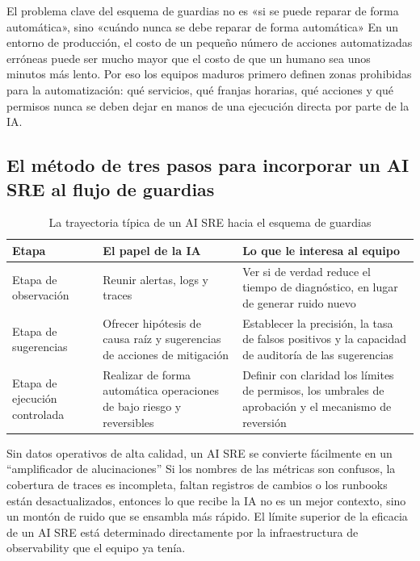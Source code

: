 \documentclass[a4paper]{article}
\begin{document}
\begin{importantbox}{El problema clave del esquema de guardias no es «si se puede reparar de forma automática», sino «cuándo nunca se debe reparar de forma automática»}
En un entorno de producción, el costo de un pequeño número de acciones automatizadas erróneas puede ser mucho mayor que el costo de que un humano sea unos minutos más lento. Por eso los equipos maduros primero definen zonas prohibidas para la automatización: qué servicios, qué franjas horarias, qué acciones y qué permisos nunca se deben dejar en manos de una ejecución directa por parte de la IA.
\end{importantbox}

\subsection{El método de tres pasos para incorporar un AI SRE al flujo de guardias}

\begin{table}[H]
\centering
\begin{tabular}{p{} p{} p{}}
\toprule
Etapa & El papel de la IA & Lo que le interesa al equipo \\
\midrule
Etapa de observación & Reunir alertas, logs y traces & Ver si de verdad reduce el tiempo de diagnóstico, en lugar de generar ruido nuevo \\
Etapa de sugerencias & Ofrecer hipótesis de causa raíz y sugerencias de acciones de mitigación & Establecer la precisión, la tasa de falsos positivos y la capacidad de auditoría de las sugerencias \\
Etapa de ejecución controlada & Realizar de forma automática operaciones de bajo riesgo y reversibles & Definir con claridad los límites de permisos, los umbrales de aprobación y el mecanismo de reversión \\
\bottomrule
\end{tabular}
\caption{La trayectoria típica de un AI SRE hacia el esquema de guardias}
\end{table}

\begin{warningbox}{Sin datos operativos de alta calidad, un AI SRE se convierte fácilmente en un ``amplificador de alucinaciones''}
Si los nombres de las métricas son confusos, la cobertura de traces es incompleta, faltan registros de cambios o los runbooks están desactualizados, entonces lo que recibe la IA no es un mejor contexto, sino un montón de ruido que se ensambla más rápido. El límite superior de la eficacia de un AI SRE está determinado directamente por la infraestructura de observability que el equipo ya tenía.
\end{warningbox}
\end{document}
